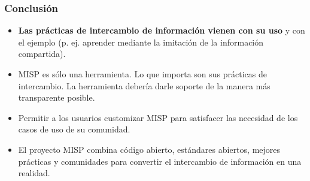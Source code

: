 \begin{frame}
        \frametitle{Conclusión}
        \begin{itemize}
                \item {\bf Las prácticas de intercambio de información vienen con su uso} y con el ejemplo (p. ej. aprender mediante la imitación de la información compartida).
                \item MISP es sólo una herramienta. Lo que importa son sus prácticas de intercambio. La herramienta debería darle soporte de la manera más transparente posible.
                \item Permitir a los usuarios customizar MISP para satisfacer las necesidad de los casos de uso de su comunidad.
                \item El proyecto MISP combina código abierto, estándares abiertos, mejores prácticas y comunidades para convertir el intercambio de información en una realidad.
        \end{itemize}
\end{frame}


